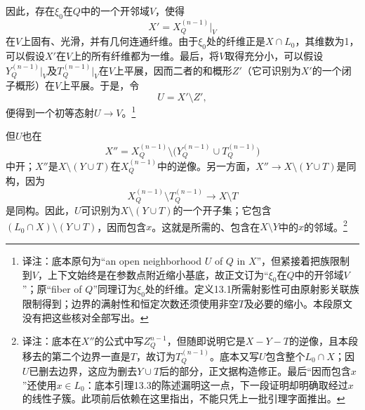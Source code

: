 \documentclass[openany,fontset=fandol]{ctexbook}
\newcommand{\note}[1]{\footnote{译注：#1}}
\begin{document}
\newpage
因此，存在$\xi_0$在$Q$中的一个开邻域$V$，使得
\[
X'=X_Q^{(n-1)}\big|_V
\]
在$V$上固有、光滑，并有几何连通纤维。由于$\xi_0$处的纤维正是$X\cap L_0$，其维数为1，可以假设$X'$在$V$上的所有纤维都为一维。最后，将$V$取得充分小，可以假设$Y_Q^{(n-1)}|_V$及$T_Q^{(n-1)}|_V$在$V$上平展，因而二者的和概形$Z'$（它可识别为$X'$的一个闭子概形）在$V$上平展。于是，令
\[
U=X'\setminus Z',
\]
便得到一个初等态射$U\to V$。\note{底本原句为“an open neighborhood $U$ of $Q$ in $X$”，但紧接着把族限制到$V$，上下文始终是在参数点附近缩小基底，故正文订为“$\xi_0$在$Q$中的开邻域$V$”；原“fiber of $Q$”同理订为$\xi_0$处的纤维。定义13.1所需射影性可由原射影关联族限制得到；边界的满射性和恒定次数还须使用非空$T$及必要的缩小。本段原文没有把这些核对全部写出。}

但$U$也在
\[
X''=X_Q^{(n-1)}\setminus
\bigl(Y_Q^{(n-1)}\cup T_Q^{(n-1)}\bigr)
\]
中开；$X''$是$X\setminus(Y\cup T)$在$X_Q^{(n-1)}$中的逆像。另一方面，$X''\to X\setminus(Y\cup T)$是同构，因为
\[
X_Q^{(n-1)}\setminus T_Q^{(n-1)}\longrightarrow X\setminus T
\]
是同构。因此，$U$可识别为$X\setminus(Y\cup T)$的一个开子集；它包含$(L_0\cap X)\setminus(Y\cup T)$，因而包含$x$。这就是所需的、包含在$X\setminus Y$中的$x$的邻域。\note{底本在$X''$的公式中写$Z_Q^{n-1}$，但随即说明它是$X-Y-T$的逆像，且本段移去的第二个边界一直是$T$，故订为$T_Q^{(n-1)}$。底本又写$U$包含整个$L_0\cap X$；因$U$已删去边界，这应为删去$Y\cup T$后的部分，正文据构造修正。最后“因而包含$x$”还使用$x\in L_0$：底本引理13.3的陈述漏明这一点，下一段证明却明确取经过$x$的线性子簇。此项前后依赖在这里指出，不能只凭上一批引理字面推出。}
\end{document}
